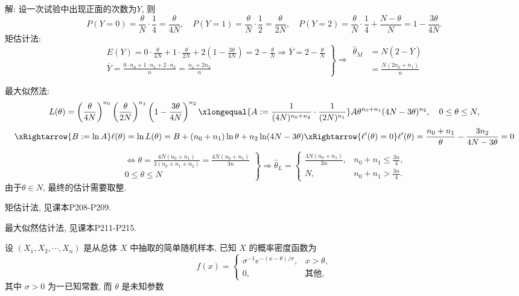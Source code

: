 \documentclass[standard]{ExBook}
\renewenvironment{shaded}{%
  \def\FrameCommand{\fboxsep=\FrameSep \colorbox{shadecolor}}%
  \MakeFramed{\advance\hsize-\width \FrameRestore}%
}{%
  \endMakeFramed
}
\begin{document}
\begin{qitems}
\vspace{\dimexpr2.5cm-5em\relax}

解: 设一次试验中出现正面的次数为$Y$, 则
$$
P(Y=0)=\frac{\theta}{N}\cdot\frac14=\frac{\theta}{4N},
\quad
P(Y=1)=\frac{\theta}{N}\cdot\frac12=\frac{\theta}{2N},
\quad
P(Y=2)=\frac{\theta}{N}\cdot\frac14+\frac{N-\theta}{N}
=1-\frac{3\theta}{4N}.
$$
 矩估计法:
$$
\left.
\begin{array}{r}
E(Y)
=\displaystyle0\cdot\frac{\theta}{4N}
+1\cdot\frac{\theta}{2N}
+2\left(1-\frac{3\theta}{4N}\right)
=2-\frac{\theta}{N}
\Longrightarrow
\overline{Y}=2-\frac{\theta}{N}\\
\overline{Y}
=\displaystyle\frac{0\cdot n_0+1\cdot n_1+2\cdot n_2}{n}
=\frac{n_1+2n_2}{n}
\end{array}
\right\}
\Longrightarrow
\begin{aligned}
\hat{\theta}_{M}
&=N(2-\overline{Y})\\
&=\frac{N(2n_0+n_1)}{n}
\end{aligned}
$$

 最大似然法:
$$
L(\theta)
=\left(\frac{\theta}{4N}\right)^{n_0}
\left(\frac{\theta}{2N}\right)^{n_1}
\left(1-\frac{3\theta}{4N}\right)^{n_2}
\xlongequal{A:=\frac{1}{(4N)^{n_0+n_2}}\cdot\frac{1}{(2N)^{n_1}}}
A\theta^{n_0+n_1}(4N-3\theta)^{n_2},
\quad 0\leq\theta\leq N,
$$
$$
\xRightarrow{B:=\ln A}
\ell(\theta)=\ln L(\theta)
=B+(n_0+n_1)\ln\theta+n_2\ln(4N-3\theta)
\xRightarrow{\ell'(\theta)=0}
\ell'(\theta)
=\frac{n_0+n_1}{\theta}-\frac{3n_2}{4N-3\theta}=0
$$
$$
\left.
\begin{array}{r}
\Longleftrightarrow
\displaystyle
\theta=\frac{4N(n_0+n_1)}{3(n_0+n_1+n_2)}
=\frac{4N(n_0+n_1)}{3n}\\
0 \leq \theta \leq N
\end{array}
\right\}
\Longrightarrow
\hat{\theta}_{L}
=
\left\{
\begin{array}{ll}
\displaystyle \frac{4N(n_0+n_1)}{3n}, & n_0+n_1\leq \displaystyle\frac{3n}{4},\\[0.9em]
N, & n_0+n_1> \displaystyle\frac{3n}{4}.
\end{array}
\right.
$$
由于$\theta\in N$, 最终的估计需要取整.

\textcolor{themeColor}{\selectfont {} 矩估计法, 见课本P208-P209.}

\textcolor{themeColor}{\selectfont {} 最大似然估计法, 见课本P211-P215.}

\vspace{2.5cm-5em}

    \begin{bbox}
    \begin{shaded}
        \qitem
设 \( (X_1, X_2, \cdots, X_n) \) 是从总体 \( X \) 中抽取的简单随机样本, 已知 \( X \) 的概率密度函数为
\[f(x) =
\begin{cases}
\sigma^{-1} e^{-(x-\theta)/\sigma}, & x > \theta, \\
0, & \text{其他},
\end{cases}\]
其中 \( \sigma > 0 \) 为一已知常数, 而 \( \theta \) 是未知参数


\end{shaded}
\end{bbox}
\end{qitems}
\end{document}
